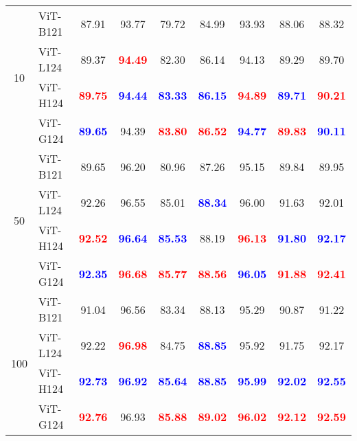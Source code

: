 \begin{table*}[ht]{\textwidth=0mm}
{\begin{tabular}{c | l | c c c c c | c | c }
        \multirow{4}{*}{10} & ViT-B121\cite{wang2022advancing} & 87.91 & 93.77 & 79.72 & 84.99 & 93.93 & 88.06 & 88.32 \\
        & ViT-L124 & 89.37 & \textbf{\textcolor{red}{94.49}} & 82.30 & 86.14 & 94.13 & 89.29 & 89.70 \\
        & ViT-H124 & \textbf{\textcolor{red}{89.75}} & \textbf{\textcolor{blue}{94.44}} & \textbf{\textcolor{blue}{83.33}} & \textbf{\textcolor{blue}{86.15}} & \textbf{\textcolor{red}{94.89}} & \textbf{\textcolor{blue}{89.71}} & \textbf{\textcolor{red}{90.21}} \\
        & ViT-G124 & \textbf{\textcolor{blue}{89.65}} & 94.39 & \textbf{\textcolor{red}{83.80}} & \textbf{\textcolor{red}{86.52}} & \textbf{\textcolor{blue}{94.77}} & \textbf{\textcolor{red}{89.83}} & \textbf{\textcolor{blue}{90.11}} \\ \hline

        \multirow{4}{*}{50} & ViT-B121\cite{wang2022advancing} & 89.65 & 96.20 & 80.96 & 87.26 & 95.15 & 89.84 & 89.95 \\
        & ViT-L124 & 92.26 & 96.55 & 85.01 & \textbf{\textcolor{blue}{88.34}} & 96.00 & 91.63 & 92.01 \\
        & ViT-H124 & \textbf{\textcolor{red}{92.52}} & \textbf{\textcolor{blue}{96.64}} & \textbf{\textcolor{blue}{85.53}} & 88.19 & \textbf{\textcolor{red}{96.13}} & \textbf{\textcolor{blue}{91.80}} & \textbf{\textcolor{blue}{92.17}} \\
        & ViT-G124 & \textbf{\textcolor{blue}{92.35}} & \textbf{\textcolor{red}{96.68}} & \textbf{\textcolor{red}{85.77}} & \textbf{\textcolor{red}{88.56}} & \textbf{\textcolor{blue}{96.05}} & \textbf{\textcolor{red}{91.88}} & \textbf{\textcolor{red}{92.41}} \\ \hline

        \multirow{4}{*}{100} & ViT-B121\cite{wang2022advancing} & 91.04 & 96.56 & 83.34 & 88.13 & 95.29 & 90.87 & 91.22 \\
        & ViT-L124 & 92.22 & \textbf{\textcolor{red}{96.98}} & 84.75 & \textbf{\textcolor{blue}{88.85}} & 95.92 & 91.75 & 92.17 \\
        & ViT-H124 & \textbf{\textcolor{blue}{92.73}} &\textbf{\textcolor{blue}{ 96.92}} & \textbf{\textcolor{blue}{85.64}} & \textbf{\textcolor{blue}{88.85}} & \textbf{\textcolor{blue}{95.99}} & \textbf{\textcolor{blue}{92.02}} & \textbf{\textcolor{blue}{92.55}} \\
        & ViT-G124 & \textbf{\textcolor{red}{92.76}} & 96.93 & \textbf{\textcolor{red}{85.88}} & \textbf{\textcolor{red}{89.02}} & \textbf{\textcolor{red}{96.02}} & \textbf{\textcolor{red}{92.12}} & \textbf{\textcolor{red}{92.59}} \\ \hline



\end{tabular}}
\end{table*}
